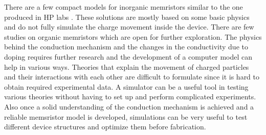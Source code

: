 \begin{doublespace}
There are a few compact models for inorganic memristors similar to the one produced in HP labs \cite{ChuaSim}\cite{MemCircuitSim}. These solutions are mostly based on some basic physics and do not fully simulate the charge movement inside the device. There are few studies on organic memristors \cite{OrganicMem} which are open for further exploration. The physics behind the conduction mechanism and the changes in the conductivity due to doping requires further research and the development of a computer model can help in various ways. Theories that explain the movement of charged particles and their interactions with each other are difficult to formulate since it is hard to obtain required experimental data. A simulator can be a useful tool in testing various theories without having to set up and perform complicated experiments. Also once a solid understanding of the conduction mechanism is achieved and a reliable memsristor model is developed, simulations can be very useful to test different device structures and optimize them before fabrication. 


 \end{doublespace}